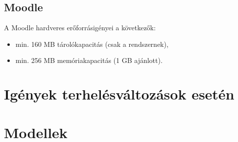 
\subsection{Moodle}
A Moodle hardveres erőforrásigényei a következők:
\begin{itemize}
\item min. 160 MB tárolókapacitás (csak a rendszernek),
\item min. 256 MB memóriakapacitás (1 GB ajánlott).
\end{itemize}

\section{Igények terhelésváltozások esetén}
\todo{}
\section{Modellek}
\todo{}
